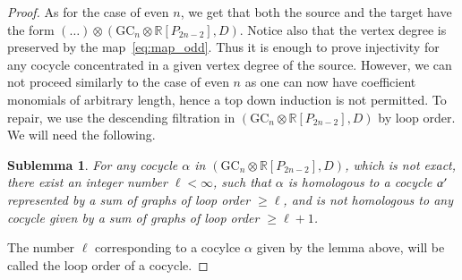 \documentclass[a4paper]{amsart}
\theoremstyle{plain}
\newtheorem{sublemma}[thm]{Sublemma}
\theoremstyle{definition}
\newcommand{\R}{{\mathbb{R}}}
\newcommand{\GC}{\mathrm{GC}}
\begin{document}
\begin{proof} 
As for the case of even $n$, we get that both the source and the target have the form $(\dots)\otimes (\GC_n\otimes \R[P_{2n-2}],D)$. Notice also that the vertex degree is preserved by the map~\eqref{eq:map_odd}.  Thus it is enough to prove injectivity for any cocycle concentrated
in a given vertex degree  of the source. However, we can not proceed similarly to the case of even $n$ as
one can now have coefficient monomials of arbitrary length, hence a top down induction is not permitted. 
 To repair, we use the descending filtration in $(\GC_n\otimes \R[P_{2n-2}],D)$ by loop order. We will need the following.
 \begin{sublemma}\label{l:loop}
 For any cocycle $\alpha$ in $(\GC_n\otimes \R[P_{2n-2}],D)$, which is not exact, there exist an integer number $\ell<\infty$, such that $\alpha$
 is homologous to a cocycle $\alpha\rq{}$ represented by a sum of graphs of loop order $\geq \ell$, and is not homologous to any cocycle
 given by a sum of graphs of loop order $\geq \ell+1$.
 \end{sublemma}
 The number $\ell$ corresponding to a cocylce $\alpha$ given by the lemma above, will be called the loop order of a cocycle.
 

\end{proof}
\end{document}
